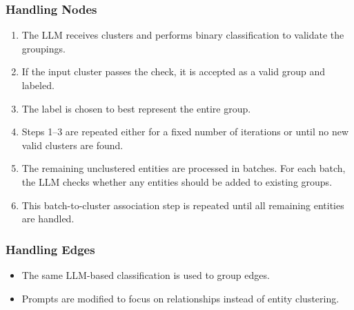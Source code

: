 \documentclass[12pt]{article}
\begin{document}
\subsubsection*{Handling Nodes}
\begin{enumerate}[label=(\arabic*)]
    \item The LLM receives clusters and performs binary classification to validate the groupings.
    \item If the input cluster passes the check, it is accepted as a valid group and labeled.
    \item The label is chosen to best represent the entire group.
    \item Steps 1--3 are repeated either for a fixed number of iterations or until no new valid clusters are found.
    \item The remaining unclustered entities are processed in batches. For each batch, the LLM checks whether any entities should be added to existing groups.
    \item This batch-to-cluster association step is repeated until all remaining entities are handled.
\end{enumerate}

\subsubsection*{Handling Edges}
\begin{itemize}
    \item The same LLM-based classification is used to group edges.
    \item Prompts are modified to focus on relationships instead of entity clustering.
\end{itemize}
\end{document}
